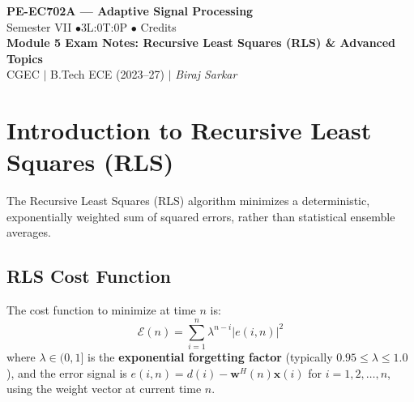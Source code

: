 \documentclass[12pt,a4paper]{article}
\begin{document}

\begin{center}
  {\LARGE\bfseries\color{myred} PE-EC702A --- Adaptive Signal Processing}\\[5pt]
  {\normalsize\color{mydark} Semester VII \quad$\bullet$\quad 3L:0T:0P \quad$\bullet$ Credits}\\[3pt]
  {\normalsize\color{myteal}\textbf{Module 5 Exam Notes: Recursive Least Squares (RLS) \& Advanced Topics}}\\[3pt]
  {\small\color{mydark} CGEC \;$|$\; B.Tech ECE (2023--27) \;$|$\; \textit{Biraj Sarkar}}
\end{center}
\vspace{2pt}
\noindent{\color{myred}\rule{\linewidth}{1.5pt}}
\vspace{2pt}

\hypersetup{linkcolor=mydark}
\tableofcontents
\hypersetup{linkcolor=myteal}
\newpage

\section{Introduction to Recursive Least Squares (RLS)}

The Recursive Least Squares (RLS) algorithm minimizes a deterministic, exponentially weighted sum of squared errors, rather than statistical ensemble averages. 

\subsection{RLS Cost Function}
The cost function to minimize at time $n$ is:
\begin{equation}
  \mathcal{E}(n) = \sum_{i=1}^n \lambda^{n-i} |e(i, n)|^2
\end{equation}
where $\lambda \in (0, 1]$ is the \textbf{exponential forgetting factor} (typically $0.95 \le \lambda \le 1.0$), and the error signal is $e(i, n) = d(i) - \mathbf{w}^H(n) \mathbf{x}(i)$ for $i=1, 2, \dots, n$, using the weight vector at current time $n$.
\end{document}
